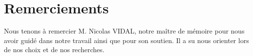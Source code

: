 \documentclass[a4paper, 12pt]{article} %
\makeatletter
\renewcommand{\maketitle}{ %
\begin{flushright} %
{\LARGE\@title} %

\vspace{50pt} %

{\large\@author} %

\vspace{40pt} %
\end{flushright}
}
\makeatother
\begin{document}



%
%


\tableofcontents
\newpage

\section{Remerciements}
Nous tenons à remercier M. Nicolas VIDAL, notre maître de mémoire pour nous avoir guidé dans notre travail ainsi que pour son soutien. Il a su nous orienter lors de nos choix et de nos recherches.

\newpage
\end{document}
